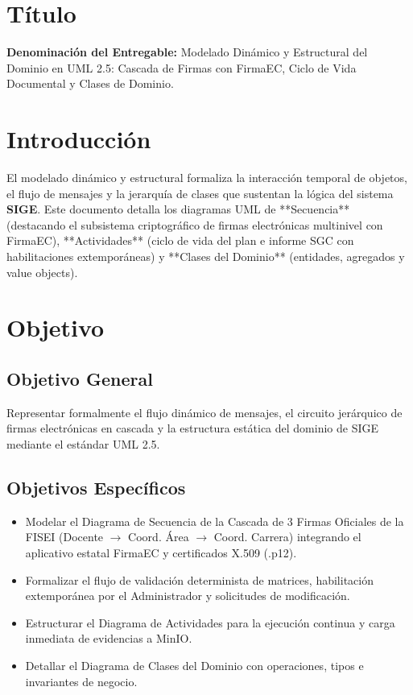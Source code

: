 \documentclass[12pt,a4paper]{article}
\begin{document}

\vspace{0.25cm}
\section{Título}
\textbf{Denominación del Entregable:} Modelado Dinámico y Estructural del Dominio en UML 2.5: Cascada de Firmas con FirmaEC, Ciclo de Vida Documental y Clases de Dominio.



\section{Introducción}
El modelado dinámico y estructural formaliza la interacción temporal de objetos, el flujo de mensajes y la jerarquía de clases que sustentan la lógica del sistema \textbf{SIGE}. Este documento detalla los diagramas UML de **Secuencia** (destacando el subsistema criptográfico de firmas electrónicas multinivel con FirmaEC), **Actividades** (ciclo de vida del plan e informe SGC con habilitaciones extemporáneas) y **Clases del Dominio** (entidades, agregados y value objects).

\section{Objetivo}

\subsection{Objetivo General}
Representar formalmente el flujo dinámico de mensajes, el circuito jerárquico de firmas electrónicas en cascada y la estructura estática del dominio de SIGE mediante el estándar UML 2.5.

\subsection{Objetivos Específicos}
\begin{itemize}[leftmargin=1.5em, itemsep=1.5pt, topsep=1.5pt]
    \item Modelar el Diagrama de Secuencia de la Cascada de 3 Firmas Oficiales de la FISEI (Docente $\rightarrow$ Coord. Área $\rightarrow$ Coord. Carrera) integrando el aplicativo estatal FirmaEC y certificados X.509 (.p12).
    \item Formalizar el flujo de validación determinista de matrices, habilitación extemporánea por el Administrador y solicitudes de modificación.
    \item Estructurar el Diagrama de Actividades para la ejecución continua y carga inmediata de evidencias a MinIO.
    \item Detallar el Diagrama de Clases del Dominio con operaciones, tipos e invariantes de negocio.
\end{itemize}
\end{document}
